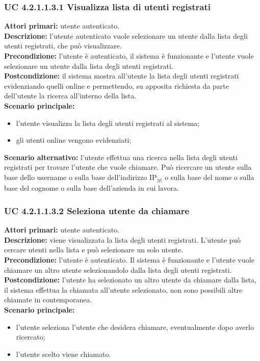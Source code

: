 \subsubsection{UC 4.2.1.1.3.1 Visualizza lista di utenti registrati}
\noindent
\textbf{Attori primari:} utente autenticato.\\
\textbf{Descrizione:} l'utente autenticato vuole selezionare un utente dalla lista degli utenti registrati, che può visualizzare.\\ %
\textbf{Precondizione:} l'utente è autenticato, il sistema è funzionante e l'utente vuole selezionare un utente dalla lista degli utenti registrati.\\
\textbf{Postcondizione:} il sistema mostra all'utente la lista degli utenti registrati evidenziando quelli online e permettendo, su apposita richiesta da parte dell'utente la ricerca all'interno della lista.\\
\textbf{Scenario principale:}
\begin{itemize}
\item l'utente visualizza la lista degli utenti registrati al sistema;
\item gli utenti online vengono evidenziati;
\end{itemize}
\textbf{Scenario alternativo:} l'utente effettua una ricerca nella lista degli utenti registrati per trovare l'utente che vuole chiamare. Può ricercare un utente sulla base dello username o sulla base dell'indirizzo IP$_{|g|}$ o sulla base del nome o sulla base del cognome o sulla base dell'azienda in cui lavora.

\subsubsection{UC 4.2.1.1.3.2 Seleziona utente da chiamare}
\noindent
\textbf{Attori primari:} utente autenticato.\\
\textbf{Descrizione:} viene visualizzata la lista degli utenti registrati. L'utente può cercare utenti nella lista e può selezionare un solo utente.\\
\textbf{Precondizione:} l'utente è autenticato. Il sistema è funzionante e l'utente vuole chiamare un altro utente selezionandolo dalla lista degli utenti registrati.\\
\textbf{Postcondizione:} l'utente ha selezionato un altro utente da chiamare dalla lista, il sistema effettua la chiamata all'utente selezionato, non sono possibili altre chiamate in contemporanea.\\
\textbf{Scenario principale:}
\begin{itemize}
\item l'utente seleziona l'utente che desidera chiamare, eventualmente dopo averlo ricercato;
\item l'utente scelto viene chiamato.
\end{itemize}

